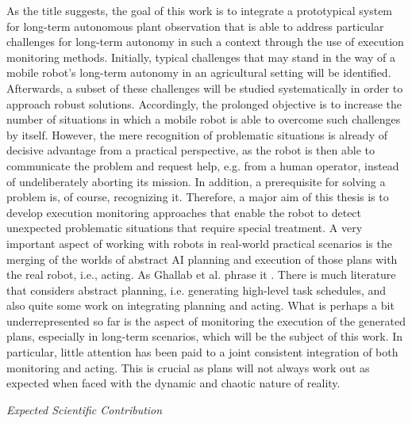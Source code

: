 \documentclass[english, master, utf8]{base/thesis_KBS}
\begin{document}
\noindent
As the title suggests, the goal of this work is to integrate a prototypical system for long-term autonomous plant observation that is able to address 
particular challenges for long-term autonomy in such a context through the use of execution monitoring methods. Initially, typical challenges that may stand in the way of a mobile
robot's long-term autonomy in an agricultural setting will be identified. Afterwards, a subset of these challenges will be studied systematically in order to 
approach robust solutions. Accordingly, the prolonged objective is to increase the number of situations in which a mobile robot is able to 
overcome such challenges by itself. However, the mere recognition of problematic situations is already of decisive advantage from a practical perspective,
as the robot is then able to communicate the problem and request help, e.g. from a human operator, instead of undeliberately aborting its mission.
In addition, a prerequisite for solving a problem is, of course, recognizing it. Therefore, a major aim of this thesis is to develop execution monitoring
approaches that enable the robot to detect unexpected problematic situations that require special treatment.
A very important aspect of working with robots in real-world practical scenarios is the merging of the worlds of abstract AI planning and execution of those plans with
the real robot, i.e., acting. As Ghallab et al. phrase it . \cite{GNT:2016} There is much literature that considers abstract planning, i.e. generating high-level
task schedules, and also quite some work on integrating planning and acting. What is perhaps a bit underrepresented so far is the aspect of monitoring the execution of the generated
plans, especially in long-term scenarios, which will be the subject of this work. In particular, little attention has been paid to a joint consistent integration of both monitoring
and acting. \cite{Ingrand:2017} This is crucial as plans will not always work out as expected when faced with the dynamic and chaotic nature of reality.\newline

\vfill
\pagebreak

\noindent
\textit{Expected Scientific Contribution}\newline
\end{document}
